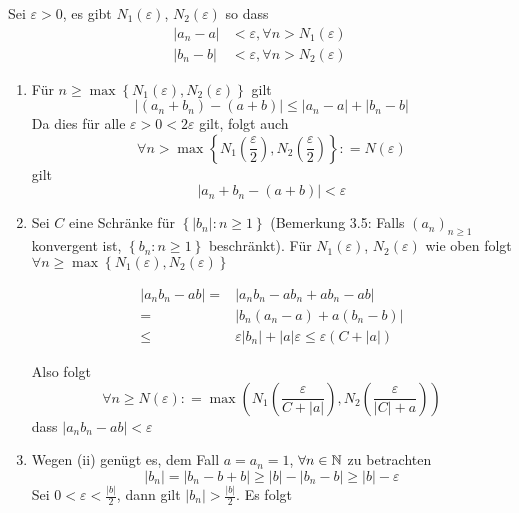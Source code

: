 \begin{beweis}{}
Sei $\varepsilon >0$, es gibt  $N_1(\varepsilon)$, $N_2(\varepsilon)$ so dass
\begin{align*}
\left| a_n-a\right|&<\varepsilon, \forall n>N_1(\varepsilon)\\
\left| b_n-b\right|&<\varepsilon, \forall n>N_2(\varepsilon)
\end{align*}
\begin{enumerate}[\hspace{2mm}i)]
\item Für $n\geq\max\left\{ N_1(\varepsilon),N_2(\varepsilon)\right\}$ gilt \[\left| {\left( {{a_n} + {b_n}} \right) - \left( {a + b} \right)} \right| \le \left| {{a_n} - a} \right| + \left| {{b_n} - b} \right|\]
Da dies für alle $\varepsilon>0<2\varepsilon$ gilt, folgt auch 
\[\forall n > \max \left\{ {{N_1}\left( {\frac{\varepsilon }{2}} \right),{N_2}\left( {\frac{\varepsilon }{2}} \right)} \right\}: = N(\varepsilon )\]
gilt \[\left| a_n+b_n-(a+b)\right| <\varepsilon\]
\item Sei $C$ eine Schränke für $\left\{ \left|b_n\right| : n\geq 1\right\}$ (Bemerkung 3.5: Falls $\left( a_n\right)_{n\geq 1}$ konvergent ist, $\left\{b_n : n\geq 1\right\}$ beschränkt). Für $N_1(\varepsilon)$, $N_2(\varepsilon)$ wie oben folgt $\forall n\geq\max\left\{ N_1(\varepsilon), N_2(\varepsilon)\right\}$

\begin{align*}
\left| {{a_n}{b_n} - ab} \right| =&\left| {{a_n}{b_n} - a{b_n} + a{b_n} - ab} \right|\\
 =&\left| {{b_n}\left( {{a_n} - a} \right) + a\left( {{b_n} - b} \right)} \right|\\
 \le&  \varepsilon \left| {{b_n}} \right| + \left| a \right|\varepsilon  \le \varepsilon \left( {C + \left| a \right|} \right)
\end{align*}

Also folgt \[\forall n \ge N(\varepsilon ): = \max \left( {{N_1}\left( {\frac{\varepsilon }{{C + \left| a \right|}}} \right),{N_2}\left( {\frac{\varepsilon }{{\left| C \right| + a}}} \right)} \right)\]dass $\left| a_nb_n-ab\right| < \varepsilon$
\item Wegen (ii) genügt es, dem Fall $a=a_n=1$, $\forall n\in\mathbb{N}$ zu betrachten 
\[\left| {{b_n}} \right| = \left| {{b_n} - b + b} \right| \ge \left| b \right| - \left| {{b_n} - b} \right| \ge \left| b \right| - \varepsilon \]
Sei $0 < \varepsilon < \frac{\left| b\right|}{2}$, dann gilt $\left| b_n\right| > \frac{\left| b\right|}{2}$. Es folgt 


\end{enumerate}
\end{beweis}
